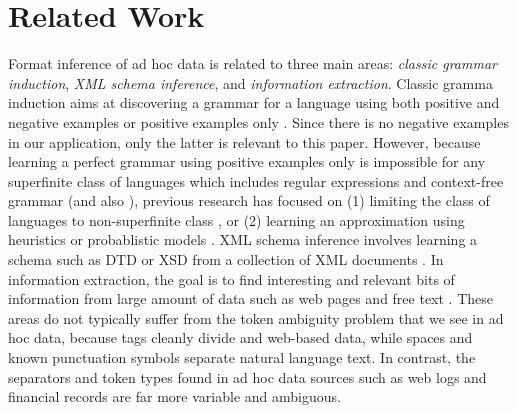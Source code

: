 \section{Related Work}\label{sec:related}

Format inference of ad hoc data is related to three main areas: 
{\em classic grammar induction}, {\em XML schema inference},
and {\em information extraction}. Classic gramma induction aims at
discovering a grammar for a language using both positive and
negative examples or positive examples only \cite{vidal:gisurvey}. 
Since there is no negative examples in our application, only the latter
is relevant to this paper. However, because learning a perfect
grammar using positive examples only is impossible for any superfinite class 
of languages \cite{gold:inference}
which includes regular expressions and context-free grammar (and also
\pads), previous research has focused on (1) limiting the class of
languages to non-superfinite class 
\cite{angluin:revesible-language-inference,bex+:dtd-inference}, or 
(2) learning an approximation using heuristics or 
probablistic models \cite{hong:thesis,Chen95bayesiangrammar}.
XML schema inference involves learning a schema such as DTD or XSD
from a collection of XML documents \cite{bex+:dtd-inference,garofalakis+:xtract}.
In information extraction, the goal is to find interesting and relevant
bits of information from large amount of data such as 
web pages \cite{kushmerick-phd1997,arasu+:sigmod03} and 
free text \cite{soderland:whisk,Pinto+:texttables,borkar+:text-segmentation}.
These areas do not typically suffer from the token ambiguity problem that 
we see in ad hoc data, because tags cleanly divide \xml{} and web-based data, 
while spaces and known punctuation symbols separate natural language text.
In contrast, the separators and token types found in ad hoc data sources such as
web logs and financial records are far more variable and ambiguous.  

